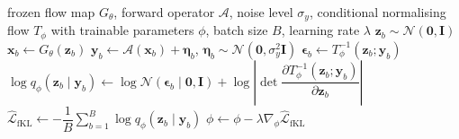 \documentclass[12pt,a4paper]{report}
\begin{document}
\begin{algorithm}[H]
\caption{Training the noise adapter with the forward-KL objective}
\label{alg:fkl}
\begin{algorithmic}[1]
\Require frozen flow map $G_{\theta}$, forward operator $\mathcal{A}$, noise level $\sigma_y$, conditional normalising flow $T_{\phi}$ with trainable parameters $\phi$, batch size $B$, learning rate $\lambda$
\Repeat
    \State $\mathbf{z}_b\sim\mathcal{N}(\mathbf{0},\mathbf{I})$
    \State $\mathbf{x}_b\gets G_{\theta}(\mathbf{z}_b)$
    \State $\mathbf{y}_b\gets\mathcal{A}(\mathbf{x}_b)+\boldsymbol{\eta}_b$, \quad $\boldsymbol{\eta}_b\sim\mathcal{N}(\mathbf{0},\sigma_y^2\mathbf{I})$
    \State $\boldsymbol{\epsilon}_b\gets T_{\phi}^{-1}(\mathbf{z}_b;\mathbf{y}_b)$
    \State $\log q_{\phi}(\mathbf{z}_b\mid\mathbf{y}_b)\gets\log\mathcal{N}(\boldsymbol{\epsilon}_b\mid\mathbf{0},\mathbf{I})+\log\left|\det\dfrac{\partial T_{\phi}^{-1}(\mathbf{z}_b;\mathbf{y}_b)}{\partial\mathbf{z}_b}\right|$
  \EndFor
  \State $\hat{\mathcal{L}}_{\mathrm{fKL}}\gets-\dfrac{1}{B}\displaystyle\sum_{b=1}^{B}\log q_{\phi}(\mathbf{z}_b\mid\mathbf{y}_b)$
  \State $\phi\gets\phi-\lambda\nabla_{\phi}\hat{\mathcal{L}}_{\mathrm{fKL}}$
\end{algorithmic}
\end{algorithm}









\end{document}
